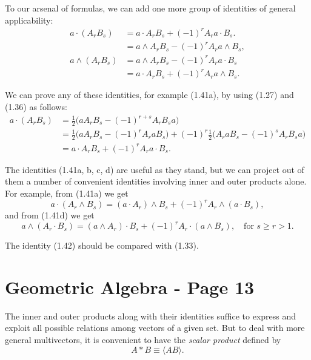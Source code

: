 \documentclass[fleqn]{scrartcl}
\numberwithin{equation}{section}
\begin{document}
\vspace{1em}
\noindent To our arsenal of formulas, we can add one more group of identities of general applicability:
\begin{align}
a \cdot (A_r B_s) &= a \cdot A_r B_s + (-1)^r A_r a \cdot B_s. \tag{1.41a} \\
&= a \wedge A_r B_s - (-1)^r A_r a \wedge B_s, \tag{1.41b} \\
a \wedge (A_r B_s) &= a \wedge A_r B_s - (-1)^r A_r a \cdot B_s \tag{1.41c} \\
&= a \cdot A_r B_s + (-1)^r A_r a \wedge B_s. \tag{1.41d}
\end{align}

\noindent We can prove any of these identities, for example (1.41a), by using (1.27) and (1.36) as follows:
\begin{align*}
a \cdot (A_r B_s) &= \tfrac{1}{2} \big(a A_r B_s - (-1)^{r+s} A_r B_s a\big) \\
&= \tfrac{1}{2} \big(a A_r B_s - (-1)^r A_r a B_s\big) + (-1)^r \tfrac{1}{2} \big(A_r a B_s - (-1)^s A_r B_s a\big) \\
&= a \cdot A_r B_s + (-1)^r A_r a \cdot B_s.
\end{align*}

\noindent The identities (1.41a, b, c, d) are useful as they stand, but we can project out of them a number of convenient identities involving inner and outer products alone. For example, from (1.41a) we get
\begin{equation}
a \cdot (A_r \wedge B_s) = (a \cdot A_r) \wedge B_s + (-1)^r A_r \wedge (a \cdot B_s), \tag{1.42}
\end{equation}
and from (1.41d) we get
\begin{equation}
a \wedge (A_r \cdot B_s) = (a \wedge A_r) \cdot B_s + (-1)^r A_r \cdot (a \wedge B_s), \quad \text{for } s \geq r > 1. \tag{1.43}
\end{equation}

\noindent The identity (1.42) should be compared with (1.33).

\section*{Geometric Algebra - Page 13}

\noindent The inner and outer products along with their identities suffice to express and exploit all possible relations among vectors of a given set. But to deal with more general multivectors, it is convenient to have the \textit{scalar product} defined by
\begin{equation}
A * B \equiv \langle AB \rangle. \tag{1.44}
\end{equation}
\end{document}
